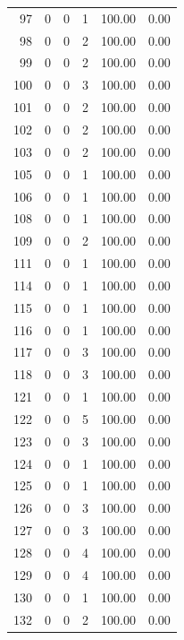 \documentclass[11pt]{article}
\begin{document}
\begin{longtable}{r|r|r|r|r|r}
    97    & 0     & 0     & 1     & 100.00 & 0.00 \\
    98    & 0     & 0     & 2     & 100.00 & 0.00 \\
    99    & 0     & 0     & 2     & 100.00 & 0.00 \\
    100   & 0     & 0     & 3     & 100.00 & 0.00 \\
    101   & 0     & 0     & 2     & 100.00 & 0.00 \\
    102   & 0     & 0     & 2     & 100.00 & 0.00 \\
    103   & 0     & 0     & 2     & 100.00 & 0.00 \\
    105   & 0     & 0     & 1     & 100.00 & 0.00 \\
    106   & 0     & 0     & 1     & 100.00 & 0.00 \\
    108   & 0     & 0     & 1     & 100.00 & 0.00 \\
    109   & 0     & 0     & 2     & 100.00 & 0.00 \\
    111   & 0     & 0     & 1     & 100.00 & 0.00 \\
    114   & 0     & 0     & 1     & 100.00 & 0.00 \\
    115   & 0     & 0     & 1     & 100.00 & 0.00 \\
    116   & 0     & 0     & 1     & 100.00 & 0.00 \\
    117   & 0     & 0     & 3     & 100.00 & 0.00 \\
    118   & 0     & 0     & 3     & 100.00 & 0.00 \\
    121   & 0     & 0     & 1     & 100.00 & 0.00 \\
    122   & 0     & 0     & 5     & 100.00 & 0.00 \\
    123   & 0     & 0     & 3     & 100.00 & 0.00 \\
    124   & 0     & 0     & 1     & 100.00 & 0.00 \\
    125   & 0     & 0     & 1     & 100.00 & 0.00 \\
    126   & 0     & 0     & 3     & 100.00 & 0.00 \\
    127   & 0     & 0     & 3     & 100.00 & 0.00 \\
    128   & 0     & 0     & 4     & 100.00 & 0.00 \\
    129   & 0     & 0     & 4     & 100.00 & 0.00 \\
    130   & 0     & 0     & 1     & 100.00 & 0.00 \\
    132   & 0     & 0     & 2     & 100.00 & 0.00 \\

\end{longtable}
\end{document}
